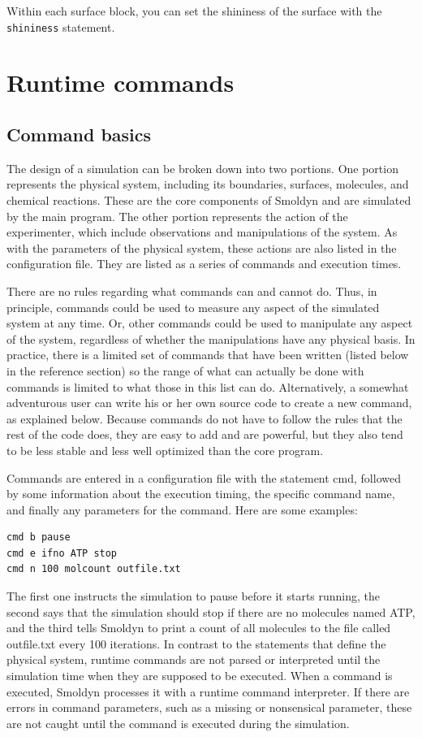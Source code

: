 \documentclass {scrbook}
\newcommand {\ttt} {\texttt}
\begin{document}
Within each surface block, you can set the shininess of the surface with the \ttt{shininess} statement.


\chapter{Runtime commands}

\section{Command basics}

The design of a simulation can be broken down into two portions. One portion represents the physical system, including its boundaries, surfaces, molecules, and chemical reactions. These are the core components of Smoldyn and are simulated by the main program. The other portion represents the action of the experimenter, which include observations and manipulations of the system. As with the parameters of the physical system, these actions are also listed in the configuration file. They are listed as a series of commands and execution times.

There are no rules regarding what commands can and cannot do. Thus, in principle, commands could be used to measure any aspect of the simulated system at any time. Or, other commands could be used to manipulate any aspect of the system, regardless of whether the manipulations have any physical basis. In practice, there is a limited set of commands that have been written (listed below in the reference section) so the range of what can actually be done with commands is limited to what those in this list can do. Alternatively, a somewhat adventurous user can write his or her own source code to create a new command, as explained below. Because commands do not have to follow the rules that the rest of the code does, they are easy to add and are powerful, but they also tend to be less stable and less well optimized than the core program.

Commands are entered in a configuration file with the statement cmd, followed by some information about the execution timing, the specific command name, and finally any parameters for the command. Here are some examples:

\begin{lstlisting}[style=SSAC]
cmd b pause
cmd e ifno ATP stop
cmd n 100 molcount outfile.txt
\end{lstlisting}

The first one instructs the simulation to pause before it starts running, the second says that the simulation should stop if there are no molecules named ATP, and the third tells Smoldyn to print a count of all molecules to the file called outfile.txt every 100 iterations. In contrast to the statements that define the physical system, runtime commands are not parsed or interpreted until the simulation time when they are supposed to be executed. When a command is executed, Smoldyn processes it with a runtime command interpreter. If there are errors in command parameters, such as a missing or nonsensical parameter, these are not caught until the command is executed during the simulation.
\end{document}

